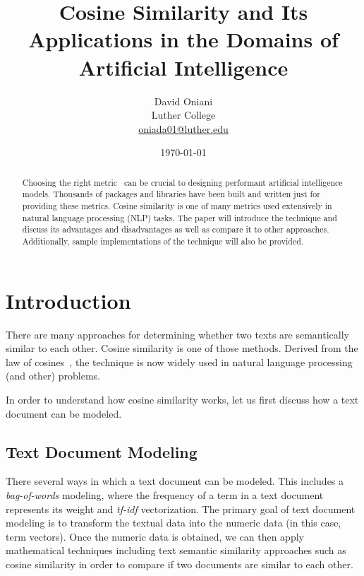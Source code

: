 \documentclass[11pt]{article}
\author{David Oniani\\
        Luther College\\
        \href{mailto:oniada01@luther.edu}{oniada01@luther.edu}}
\title{\textbf{Cosine Similarity and Its Applications in the Domains of
Artificial Intelligence}}
\date{\today}
\begin{document}
\maketitle


\begin{abstract}
  \noindent Choosing the right metric~\cite{thomas2020} can be crucial to
  designing performant artificial intelligence models. Thousands of packages
  and libraries have been built and written just for providing these metrics.
  Cosine similarity is one of many metrics used extensively in natural language
  processing (NLP) tasks. The paper will introduce the technique and discuss
  its advantages and disadvantages as well as compare it to other approaches.
  Additionally, sample implementations of the technique will also be provided.
\end{abstract}


\section{Introduction}

There are many approaches for determining whether two texts are semantically
similar to each other. Cosine similarity is one of those methods. Derived from
the law of cosines~\cite{wikicosineproof}, the technique is now widely used in
natural language processing (and other) problems.

\bigskip

In order to understand how cosine similarity works, let us first discuss how a
text document can be modeled.

\subsection{Text Document Modeling}

There several ways in which a text document can be modeled. This includes a
\textit{bag-of-words} modeling, where the frequency of a term in a text
document represents its weight and \textit{tf-idf} vectorization. The primary
goal of text document modeling is to transform the textual data into the
numeric data (in this case, term vectors). Once the numeric data is obtained,
we can then apply mathematical techniques including text semantic similarity
approaches such as cosine similarity in order to compare if two documents are
similar to each other.
\end{document}
